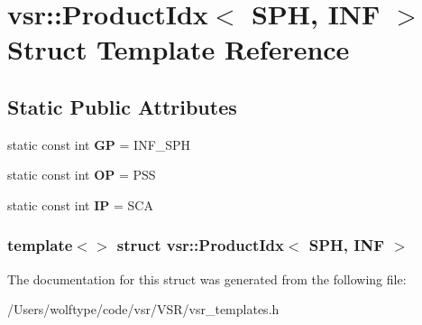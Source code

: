 \hypertarget{structvsr_1_1_product_idx_3_01_s_p_h_00_01_i_n_f_01_4}{\section{vsr\-:\-:Product\-Idx$<$ S\-P\-H, I\-N\-F $>$ Struct Template Reference}
\label{structvsr_1_1_product_idx_3_01_s_p_h_00_01_i_n_f_01_4}
}
\subsection*{Static Public Attributes}
\begin{DoxyCompactItemize}
\item 
\hypertarget{structvsr_1_1_product_idx_3_01_s_p_h_00_01_i_n_f_01_4_a3981e9983002458acb9bbf69c912e60e}{static const int {\bfseries G\-P} = I\-N\-F\-\_\-\-S\-P\-H}\label{structvsr_1_1_product_idx_3_01_s_p_h_00_01_i_n_f_01_4_a3981e9983002458acb9bbf69c912e60e}

\item 
\hypertarget{structvsr_1_1_product_idx_3_01_s_p_h_00_01_i_n_f_01_4_aeedf5d8291ae1f0c58d1c4df8d2173fe}{static const int {\bfseries O\-P} = P\-S\-S}\label{structvsr_1_1_product_idx_3_01_s_p_h_00_01_i_n_f_01_4_aeedf5d8291ae1f0c58d1c4df8d2173fe}

\item 
\hypertarget{structvsr_1_1_product_idx_3_01_s_p_h_00_01_i_n_f_01_4_a4bba66e87bd6c544df7c713ca4eaaaea}{static const int {\bfseries I\-P} = S\-C\-A}\label{structvsr_1_1_product_idx_3_01_s_p_h_00_01_i_n_f_01_4_a4bba66e87bd6c544df7c713ca4eaaaea}

\end{DoxyCompactItemize}
\subsubsection*{template$<$$>$ struct vsr\-::\-Product\-Idx$<$ S\-P\-H, I\-N\-F $>$}



The documentation for this struct was generated from the following file\-:\begin{DoxyCompactItemize}
\item 
/\-Users/wolftype/code/vsr/\-V\-S\-R/vsr\-\_\-templates.\-h\end{DoxyCompactItemize}
